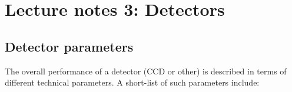 %
\section{Lecture notes 3: Detectors}

\subsection{Detector parameters}

The overall performance of a detector (CCD or other) is described in terms of
different technical parameters. A short-list of such parameters
include:

